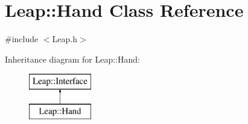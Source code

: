 \hypertarget{class_leap_1_1_hand}{\section{Leap\+:\+:Hand Class Reference}
\label{class_leap_1_1_hand}
}


{\ttfamily \#include $<$Leap.\+h$>$}

Inheritance diagram for Leap\+:\+:Hand\+:\begin{figure}[H]
\begin{center}
\leavevmode
\includegraphics[height=2.000000cm]{class_leap_1_1_hand}
\end{center}
\end{figure}
